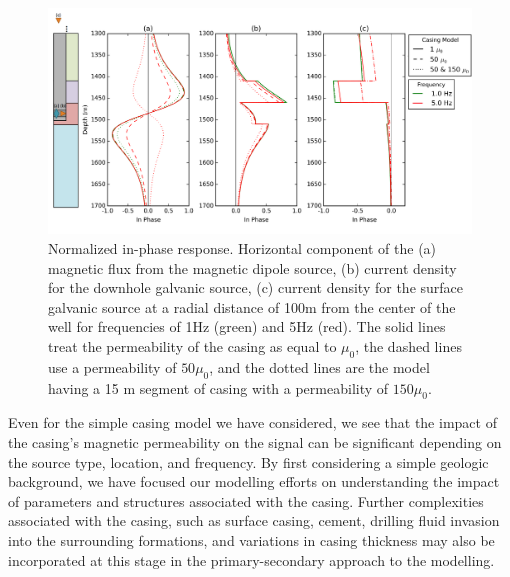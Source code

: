 \documentclass{segabs}
\begin{document}
\begin{figure}[h!]
	\centering
	\includegraphics[width=1\columnwidth]{./Figures/AnomMu}
	\caption{Normalized in-phase response. Horizontal component of the (a) magnetic flux from the magnetic dipole source, (b) current density for the downhole galvanic source, (c) current density for the surface galvanic source at a radial distance of 100m from the center of the well for frequencies of 1Hz (green) and 5Hz (red). The solid lines treat the permeability of the casing as equal to $\mu_0$, the dashed lines use a permeability of $50 \mu_0$, and the dotted lines are the model having a 15 m segment of casing with a permeability of $150 \mu_0$.}
	\label{fig:AnomMu}
\end{figure}
Even for the simple casing model we have considered, we see that the impact of the casing's magnetic permeability on the signal can be significant depending on the source type, location, and frequency. By first considering a simple geologic background, we have focused our modelling efforts on understanding the impact of parameters and structures associated with the casing. Further complexities associated with the casing, such as surface casing, cement, drilling fluid invasion into the surrounding formations, and variations in casing thickness may also be incorporated at this stage in the primary-secondary approach to the modelling. 
\end{document}
